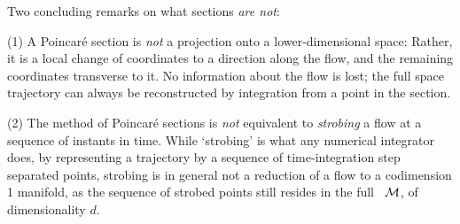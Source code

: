 Two concluding remarks on what sections \emph{are not}:

(1) A Poincar\'e section is {\em not} a projection onto a
lower-dimensional space: Rather, it is a local change of coordinates to a
direction along the flow, and the remaining coordinates transverse to it.
No information about the flow is lost; the full space trajectory can
always be reconstructed by integration from a point in the section.

(2) The method of Poincar\'e sections is {\em not} equivalent to
\emph{strobing} a flow at a sequence of instants in time. While
`strobing' is what any numerical integrator does, by representing a
trajectory by a sequence of time-integration step separated points,
strobing is in general not a reduction of a flow to a codimension 1
manifold, as the sequence of strobed points still resides in the full
\statesp\ ${\cal M}$, of dimensionality $d$.
